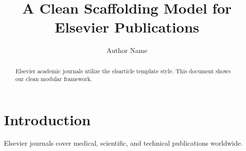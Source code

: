 \documentclass[preprint,12pt]{elsarticle}
\begin{document}
\begin{frontmatter}

\title{A Clean Scaffolding Model for Elsevier Publications}
\author{Author Name}
\address{Engineering Research Center, Elsevier University}

\begin{abstract}
Elsevier academic journals utilize the elsarticle template style. This document shows our clean modular framework.
\end{abstract}

\end{frontmatter}

\section{Introduction}
Elsevier journals cover medical, scientific, and technical publications worldwide.
\end{document}
